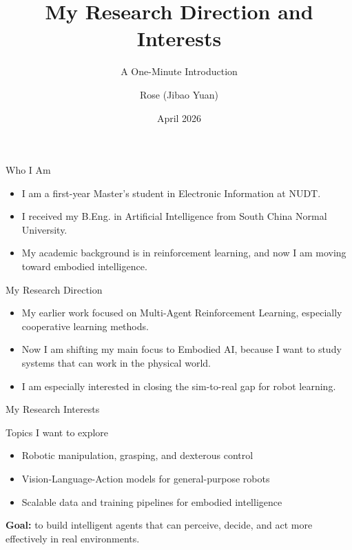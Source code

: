 \documentclass[aspectratio=169]{beamer}
\title{My Research Direction and Interests}
\subtitle{A One-Minute Introduction}
\author{Rose (Jibao Yuan)}
\institute{National University of Defense Technology}
\date{April 2026}
\begin{document}
\begin{frame}
  \titlepage
\end{frame}

\begin{frame}{Who I Am}
  \begin{itemize}
    \item I am a first-year Master's student in Electronic Information at NUDT.
    \item I received my B.Eng. in Artificial Intelligence from South China Normal University.
    \item My academic background is in reinforcement learning, and now I am moving toward embodied intelligence.
  \end{itemize}
\end{frame}

\begin{frame}{My Research Direction}
  \begin{itemize}
    \item My earlier work focused on Multi-Agent Reinforcement Learning, especially cooperative learning methods.
    \item Now I am shifting my main focus to Embodied AI, because I want to study systems that can work in the physical world.
    \item I am especially interested in closing the sim-to-real gap for robot learning.
  \end{itemize}
\end{frame}

\begin{frame}{My Research Interests}
  \begin{block}{Topics I want to explore}
    \begin{itemize}
      \item Robotic manipulation, grasping, and dexterous control
      \item Vision-Language-Action models for general-purpose robots
      \item Scalable data and training pipelines for embodied intelligence
    \end{itemize}
  \end{block}

  \vspace{0.4em}
  \textbf{Goal:} to build intelligent agents that can perceive, decide, and act more effectively in real environments.
\end{frame}
\end{document}

